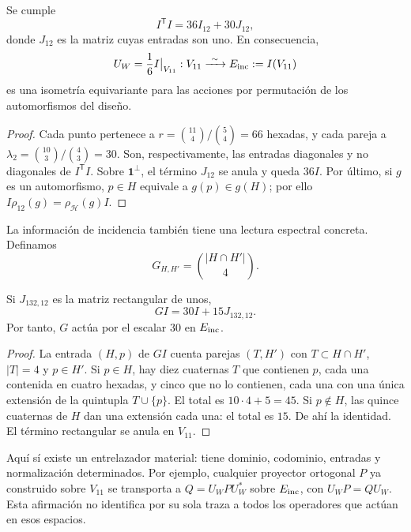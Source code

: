 \begin{proposition}
\label{exc:isometria}
Se cumple
\[
 I^{\mathsf T}I=36I_{12}+30J_{12},
\]
donde $J_{12}$ es la matriz cuyas entradas son uno. En consecuencia,
\[
 U_W=\frac16 I\big|_{V_{11}}:
 V_{11}\xrightarrow{\ \sim\ }E_{\rm inc}:=I(V_{11})
\]
es una isometría equivariante para las acciones por permutación de los
automorfismos del diseño.
\end{proposition}

\begin{proof}
Cada punto pertenece a
$r=\binom{11}{4}/\binom54=66$ hexadas, y cada pareja a
$\lambda_2=\binom{10}{3}/\binom43=30$. Son, respectivamente, las
entradas diagonales y no diagonales de $I^{\mathsf T}I$. Sobre
$\mathbf1^\perp$, el término $J_{12}$ se anula y queda $36I$.
Por último, si $g$ es un automorfismo, $p\in H$ equivale a
$g(p)\in g(H)$; por ello $I\rho_{12}(g)=\rho_{\mathcal H}(g)I$.
\end{proof}

La información de incidencia también tiene una lectura espectral
concreta. Definamos
\[
 G_{H,H'}=\binom{|H\cap H'|}{4}.
\]

\begin{lemma}
\label{exc:espectro}
Si $J_{132,12}$ es la matriz rectangular de unos,
\[
 GI=30I+15J_{132,12}.
\]
Por tanto, $G$ actúa por el escalar $30$ en $E_{\rm inc}$.
\end{lemma}

\begin{proof}
La entrada $(H,p)$ de $GI$ cuenta parejas $(T,H')$ con
$T\subset H\cap H'$, $|T|=4$ y $p\in H'$. Si $p\in H$, hay diez
cuaternas $T$ que contienen $p$, cada una contenida en cuatro hexadas,
y cinco que no lo contienen, cada una con una única extensión de la
quintupla $T\cup\{p\}$. El total es $10\cdot4+5=45$.
Si $p\notin H$, las quince cuaternas de $H$ dan una extensión cada
una: el total es $15$. De ahí la identidad. El término rectangular
se anula en $V_{11}$.
\end{proof}

Aquí sí existe un entrelazador material: tiene dominio, codominio,
entradas y normalización determinados. Por ejemplo, cualquier
proyector ortogonal $P$ ya construido sobre $V_{11}$ se transporta a
$Q=U_WPU_W^*$ sobre $E_{\rm inc}$, con
$U_WP=QU_W$. Esta afirmación no identifica por su sola traza a todos
los operadores que actúan en esos espacios.

